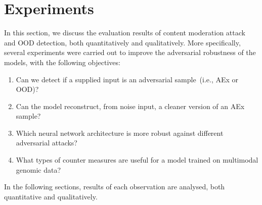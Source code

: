 \section{Experiments}\label{chapter_6:results} 
In this section, we discuss the evaluation results of content moderation attack and OOD detection, both quantitatively and qualitatively. %
More specifically, several experiments were carried out to improve the adversarial robustness of the models, with the following objectives:

\begin{enumerate}[noitemsep]
    \item Can we detect if a supplied input is an adversarial sample~(i.e., AEx or OOD)? 
    \item Can the model reconstruct, from noise input, a cleaner version of an AEx sample? 
    \item Which neural network architecture is more robust against different adversarial attacks?  
    \item What types of counter measures are useful for a model trained on multimodal genomic data?
\end{enumerate}

\hspace*{3.5mm} In the following sections, results of each observation are analysed, both quantitative and qualitatively. %


